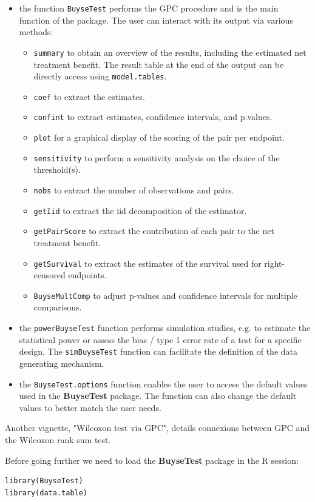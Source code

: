 \documentclass[12pt]{article}
\begin{document}
\begin{itemize}
\item the function \texttt{BuyseTest} performs the GPC procedure and is the main
function of the package. The user can interact with its output via
various methods:
\begin{itemize}
\item \texttt{summary} to obtain an overview of the results, including the
estimated net treatment benefit. The result table at the end of
the output can be directly access using \texttt{model.tables}.
\item \texttt{coef} to extract the estimates.
\item \texttt{confint} to extract estimates, confidence intervals, and p.values.
\item \texttt{plot} for a graphical display of the scoring of the pair per endpoint.
\item \texttt{sensitivity} to perform a sensitivity analysis on the choice of the threshold(s).
\item \texttt{nobs} to extract the number of observations and pairs.
\item \texttt{getIid} to extract the iid decomposition of the estimator.
\item \texttt{getPairScore} to extract the contribution of each pair to the net treatment benefit.
\item \texttt{getSurvival} to extract the estimates of the survival used for right-censored endpoints.
\item \texttt{BuyseMultComp} to adjust p-values and confidence intervals for multiple comparisons.
\end{itemize}
\item the \texttt{powerBuyseTest} function performs simulation studies, e.g. to
estimate the statistical power or assess the bias / type 1 error
rate of a test for a specific design. The \texttt{simBuyseTest} function
can facilitate the definition of the data generating mechanism.
\item the \texttt{BuyseTest.options} function enables the user to access the
default values used in the \textbf{BuyseTest} package. The function can
also change the default values to better match the user needs.
\end{itemize}

Another vignette, "Wilcoxon test via GPC", details connexions between
GPC and the Wilcoxon rank sum test.


\clearpage

Before going further we need to load the \textbf{BuyseTest} package in the R
session:
\lstset{language=r,label= ,caption= ,captionpos=b,numbers=none}
\begin{lstlisting}
library(BuyseTest)
library(data.table)
\end{lstlisting}
\end{document}
